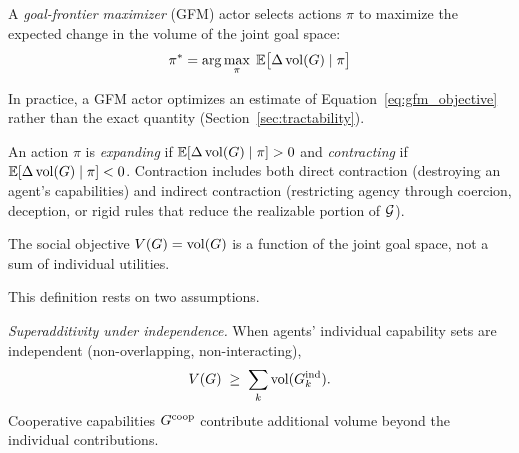 
\begin{definition}
\label{def:gfm}
A \emph{goal-frontier maximizer} (GFM) actor selects actions $\pi$ to maximize
    the expected change in the volume of the joint goal space:
\begin{equation}
\label{eq:gfm_objective}
\pi^* = \arg\max_\pi \;\mathbb{E}\bigl[\Delta \operatorname{vol}(G) \mid \pi\bigr]
\end{equation}
\end{definition}

In practice, a GFM actor optimizes an estimate of
Equation~\eqref{eq:gfm_objective} rather than the exact quantity
(Section~\ref{sec:tractability}).


\begin{definition}
\label{def:contraction_expansion}
An action $\pi$ is \emph{expanding} if $\mathbb{E}[\Delta \operatorname{vol}(G) \mid \pi] >
    0$ and \emph{contracting} if $\mathbb{E}[\Delta \operatorname{vol}(G) \mid \pi] < 0$.
    Contraction includes both direct contraction (destroying an agent's
    capabilities) and indirect contraction (restricting agency through
    coercion, deception, or rigid rules that reduce the realizable portion of
    $\mathcal{G}$).
\end{definition}


\begin{definition}
\label{def:social_objective}
The social objective $V(G) = \operatorname{vol}(G)$ is a function of the joint goal space,
    not a sum of individual utilities.
\end{definition}

This definition rests on two assumptions.

\emph{Superadditivity under independence.} When agents' individual capability sets are independent (non-overlapping, non-interacting),
\begin{equation}
\label{eq:additivity}
V(G) \;\geq\; \sum_k \operatorname{vol}(G_{k}^{\mathrm{ind}}).
\end{equation}
Cooperative capabilities $G^{\mathrm{coop}}$ contribute additional volume beyond the individual contributions.

